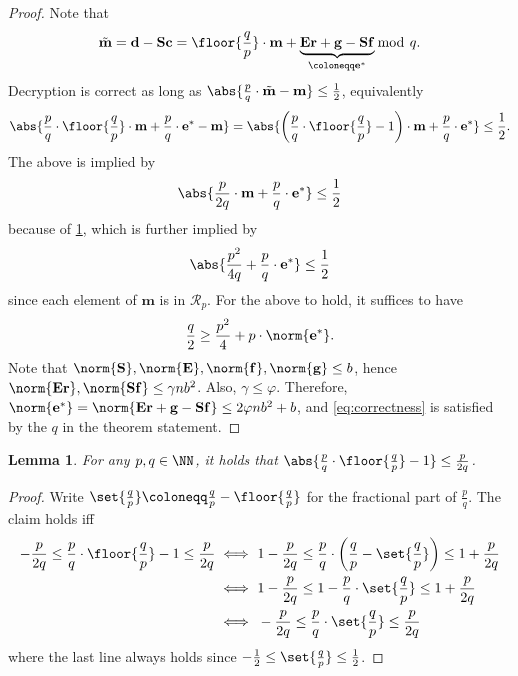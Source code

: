 \documentclass[a4paper,10pt]{article}
\renewcommand{\vec}[1]{\ensuremath{\mathbf{#1}}\xspace}
\newcommand{\mat}[1]{\ensuremath{\mathbf{#1}}\xspace}
\newcommand{\ring}{\mathcal{R}}
\newtheorem{lemma}[definition]{Lemma}
\begin{document}
\begin{proof}
  Note that 
  \[
    \tilde{\vec{m}} = \vec{d} - \mat{S} \vec{c} = \floor{\frac{q}{p}} \cdot \vec{m} + \underbrace{\mat{E} \vec{r} + \vec{g} - \mat{S} \vec{f}}_{\coloneqq \vec{e}^*} \bmod~q.
  \]
  Decryption is correct as long as %
  $\abs{ \frac{p}{q} \cdot \tilde{\vec{m}} - \vec{m} } \leq \frac{1}{2}$,
  equivalently 
  \begin{align*}
    \abs{ \frac{p}{q} \cdot \floor{\frac{q}{p}} \cdot \vec{m} + \frac{p}{q} \cdot \vec{e}^* - \vec{m} } 
    = \abs{ \left(\frac{p}{q} \cdot \floor{\frac{q}{p}} - 1\right) \cdot \vec{m} + \frac{p}{q} \cdot \vec{e}^* } \leq \frac{1}{2}. 
  \end{align*}
  The above is implied by 
  \[ \abs{ \frac{p}{2q} \cdot \vec{m} + \frac{p}{q} \cdot \vec{e}^* } \leq \frac{1}{2} \]
  because of \cref{lem:elementary}, which is further implied by 
  \[
    \abs{ \frac{p^2}{4q} + \frac{p}{q} \cdot \vec{e}^* } \leq \frac{1}{2}
  \]
  since each element of $\vec{m}$ is in $\ring_p$. 
  For the above to hold, it suffices to have 
  \begin{align}\label{eq:correctness}
    \frac{q}{2} \geq \frac{p^2}{4} + p \cdot \norm{\vec{e}^*}.  
  \end{align}
  Note that $\norm{\mat{S}}, \norm{\mat{E}}, \norm{\vec{f}}, \norm{\vec{g}} \leq b$, hence $\norm{\mat{E} \vec{r}}, \norm{\mat{S} \vec{f}} \leq \gamma n b^2$.
  Also, $\gamma \leq \varphi$.
  Therefore, $\norm{\vec{e}^*} = \norm{\mat{E} \vec{r} + \vec{g} - \mat{S} \vec{f}} \leq 2 \varphi n b^2 + b$, and \cref{eq:correctness} is satisfied by the $q$ in the theorem statement.
\end{proof}

\begin{lemma}\label{lem:elementary}
  For any $p,q \in \NN$, it holds that $\abs{\frac{p}{q} \cdot \floor{\frac{q}{p}} -1} \leq \frac{p}{2q}$.
\end{lemma}

\begin{proof}
  Write $\set{\frac{q}{p}} \coloneqq \frac{q}{p} - \floor{\frac{q}{p}}$ for the fractional part of $\frac{p}{q}$.
  The claim holds iff 
  \begin{align*}
    -\frac{p}{2q} \leq \frac{p}{q} \cdot \floor{\frac{q}{p}} -1 \leq \frac{p}{2q} 
    \iff~& 
    1-\frac{p}{2q} \leq \frac{p}{q} \cdot \left( \frac{q}{p} - \set{\frac{q}{p}} \right) \leq 1+\frac{p}{2q} \\
    \iff~&
    1-\frac{p}{2q} \leq 1 - \frac{p}{q} \cdot  \set{\frac{q}{p}} \leq 1+\frac{p}{2q} \\
    \iff~&
    -\frac{p}{2q} \leq \frac{p}{q} \cdot \set{\frac{q}{p}} \leq \frac{p}{2q} 
  \end{align*}
  where the last line always holds since $-\frac{1}{2} \leq \set{\frac{q}{p}} \leq \frac{1}{2}$.
\end{proof}
\end{document}
